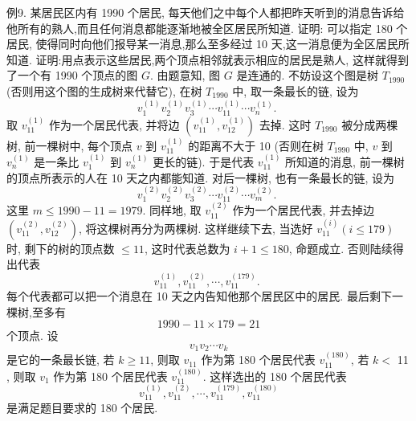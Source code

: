 例9. 某居民区内有 1990 个居民, 每天他们之中每个人都把昨天听到的消息告诉给他所有的熟人,而且任何消息都能逐渐地被全区居民所知道.
证明: 可以指定 180 个居民, 使得同时向他们报导某一消息,那么至多经过 10 天,这一消息便为全区居民所知道.
证明:用点表示这些居民,两个顶点相邻就表示相应的居民是熟人, 这样就得到了一个有 1990 个顶点的图 $G$.
由题意知, 图 $G$ 是连通的.
不妨设这个图是树 $T_{1990}$ (否则用这个图的生成树来代替它), 在树 $T_{1990}$ 中, 取一条最长的链, 设为
$$
v_1^{(1)} v_2^{(1)} v_3^{(1)} \cdots v_{11}^{(1)} \cdots v_n^{(1)} \text {. }
$$
取 $v_{11}^{(1)}$ 作为一个居民代表, 并将边 $\left(v_{11}^{(1)}, v_{12}^{(1)}\right)$ 去掉.
这时 $T_{1990}$ 被分成两棵树, 前一棵树中, 每个顶点 $v$ 到 $v_{11}^{(1)}$ 的距离不大于 10 (否则在树 $T_{1990}$ 中, $v$ 到 $v_n^{(1)}$ 是一条比 $v_1^{(1)}$ 到 $v_n^{(1)}$ 更长的链). 于是代表 $v_{11}^{(1)}$ 所知道的消息, 前一棵树的顶点所表示的人在 10 天之内都能知道.
对后一棵树, 也有一条最长的链, 设为
$$
v_1^{(2)} v_2^{(2)} v_3^{(2)} \cdots v_{11}^{(2)} \cdots v_m^{(2)} \text {. }
$$
这里 $m \leqslant 1990-11=1979$. 同样地, 取 $v_{11}^{(2)}$ 作为一个居民代表, 并去掉边 $\left(v_{11}^{(2)}, v_{12}^{(2)}\right)$, 将这棵树再分为两棵树.
这样继续下去, 当选好 $v_{11}^{(i)}(i \leqslant 179)$ 时, 剩下的树的顶点数 $\leqslant 11$, 这时代表总数为 $i+1 \leqslant 180$, 命题成立.
否则陆续得出代表
$$
v_{11}^{(1)}, v_{11}^{(2)}, \cdots, v_{11}^{(179)} \text {. }
$$
每个代表都可以把一个消息在 10 天之内告知他那个居民区中的居民.
最后剩下一棵树,至多有
$$
1990-11 \times 179=21
$$
个顶点.
设
$$
v_1 v_2 \cdots v_k
$$
是它的一条最长链, 若 $k \geqslant 11$, 则取 $v_{11}$ 作为第 180 个居民代表 $v_{11}^{(180)}$, 若 $k<$ 11 , 则取 $v_1$ 作为第 180 个居民代表 $v_{11}^{(180)}$. 这样选出的 180 个居民代表
$$
v_{11}^{(1)}, v_{11}^{(2)}, \cdots, v_{11}^{(179)}, v_{11}^{(180)}
$$
是满足题目要求的 180 个居民.


